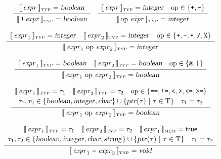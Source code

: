 \documentclass[10pt]{article}
\begin{document}
$$ \begin{array}{c}
   \typattr{\nont{expr}} = \type{boolean}
   \\[2pt]\hline\\[-10pt]
   \typattr{\term{!}\,\nont{expr}} = \type{boolean}
   \end{array}
  \quad
   \begin{array}{c}
   \typattr{\nont{expr}} = \type{integer} \quad
   \mbox{op}\in\{\term{+},\term{-}\}
   \\[2pt]\hline\\[-10pt]
   \typattr{\mbox{op}\ \nont{expr}} = \type{integer}
   \end{array} $$

$$ \begin{array}{c}
   [\![\,\mbox{\textit{expr}}_1\,]\!]_{\mbox{\tiny TYP}} = \mbox{\textsl{integer}} \quad
   [\![\,\mbox{\textit{expr}}_2\,]\!]_{\mbox{\tiny TYP}} = \mbox{\textsl{integer}} \quad
   \mbox{op}\in\{\mbox{\texttt{+}},\mbox{\texttt{-}},\mbox{\texttt{*}},\mbox{\texttt{/}},\mbox{\texttt{\%}}\}
   \\[2pt]\hline\\[-10pt]
   [\![\,\mbox{\textit{expr}}_1\ \mbox{op}\ \mbox{\textit{expr}}_2\,]\!]_{\mbox{\tiny TYP}} = \mbox{\textsl{integer}}
   \end{array} $$
 
$$ \begin{array}{c}
   [\![\,\mbox{\textit{expr}}_1\,]\!]_{\mbox{\tiny TYP}} = \mbox{\textsl{boolean}} \quad
   [\![\,\mbox{\textit{expr}}_2\,]\!]_{\mbox{\tiny TYP}} = \mbox{\textsl{boolean}} \quad
   \mbox{op}\in\{\mbox{\texttt{\&}},\mbox{\texttt{|}}\}
   \\[2pt]\hline\\[-10pt]
   [\![\,\mbox{\textit{expr}}_1\ \mbox{op}\ \mbox{\textit{expr}}_2\,]\!]_{\mbox{\tiny TYP}} = \mbox{\textsl{boolean}}
   \end{array} $$
  
$$ \begin{array}{c}
   [\![\,\mbox{\textit{expr}}_1\,]\!]_{\mbox{\tiny TYP}} = \tau_1 \quad
   [\![\,\mbox{\textit{expr}}_2\,]\!]_{\mbox{\tiny TYP}} = \tau_2 \quad
   \mbox{op}\in\{\mbox{\texttt{==}},\mbox{\texttt{!=}},\mbox{\texttt{<}},\mbox{\texttt{>}},\mbox{\texttt{<=}},\mbox{\texttt{>=}}\}\\[2pt]
   \tau_1,\tau_2 \in \{\mbox{\textsl{boolean}},\mbox{\textsl{integer}},\mbox{\textsl{char}}\} \cup \{\mbox{\textsl{ptr}}(\tau)\ | \ \tau \in \mbox{T} \} \quad \tau_1 = \tau_2
   \\[2pt]\hline\\[-10pt]
   [\![\,\mbox{\textit{expr}}_1\ \mbox{op}\ \mbox{\textit{expr}}_2\,]\!]_{\mbox{\tiny TYP}} = \mbox{\textsl{boolean}}
   \end{array} $$

$$ \begin{array}{c}
   \typattr{\nont{expr}_1} = \tau_1 \quad
   \typattr{\nont{expr}_2} = \tau_2 \quad
   \memattr{\nont{expr}_1} = \mbox{\textsf{true}} \\[2pt]
   \tau_1,\tau_2 \in \{\type{boolean},\type{integer},\type{char},\type{string}\} \cup \{\type{ptr}(\tau)\ | \ \tau \in \mbox{T} \} \quad \tau_1 = \tau_2
   \\[2pt]\hline\\[-10pt]
   \typattr{\nont{expr}_1\ \term{=}\ \nont{expr}_2} = \type{void}
   \end{array} $$
\end{document}

